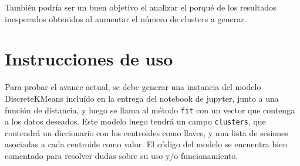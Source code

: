 \documentclass[letterpaper,11pt]{article} %
\begin{document}
	También podría ser un buen objetivo el analizar el porqué de los resultados inesperados obtenidos al aumentar el número de clusters a generar.

\section{Instrucciones de uso}
	Para probar el avance actual, se debe generar una instancia del modelo DiscreteKMeans incluído en la entrega del notebook de jupyter, junto a una función de distancia, y luego se llama al método \texttt{fit} con un vector que contenga a los datos deseados. Este modelo luego tendrá un campo \texttt{clusters}, que contendrá un diccionario con los centroides como llaves, y una lista de sesiones asociadas a cada centroide como valor. El código del modelo se encuentra bien comentado para resolver dudas sobre su uso y/o funcionamiento.

\end{document}
